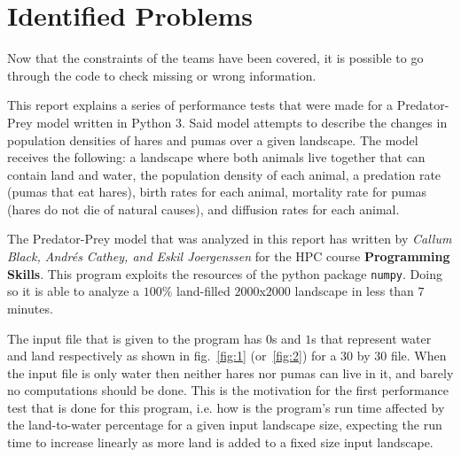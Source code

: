 \documentclass[12pt,a4paper]{article}
\begin{document}
\section{Identified Problems}

Now that the constraints of the teams have been covered, it is possible to go through the code to check missing or wrong information.




This report explains a series of performance tests that were made for a 
Predator-Prey model written in Python 3. Said model attempts to describe the 
changes in population densities of hares and pumas over a given landscape. The 
model receives the 
following: a landscape where both animals live together that can contain land 
and water, the population density of each animal, a predation rate (pumas that 
eat hares), birth rates for each animal, mortality rate for pumas (hares do not 
die of natural causes), and diffusion rates for each animal. 

The Predator-Prey model that was analyzed in this report has written by 
\textit{Callum Black, Andr\'es Cathey, and Eskil Joergenssen} for the HPC 
course \textbf{Programming Skills}. This program exploits the resources of the 
python package \texttt{numpy}. Doing so it is able to analyze a $100\%$ 
land-filled 
$2000$x$2000$ landscape in less than $7$ minutes. 

The input file that is given to the program has $0$s and $1$s that represent 
water and land respectively as shown in fig.~\ref{fig:1} (or~\ref{fig:2}) for a 
$30$ by $30$ 
file. When the input file is only water then neither hares nor pumas can live in 
it, and barely no computations should be done. This is the motivation for the 
first performance test that is done for this program, i.e. how is the 
program's run time affected by the land-to-water percentage for a given input 
landscape size, expecting the run time to increase linearly as more land is 
added to a fixed size input landscape.
\end{document}
